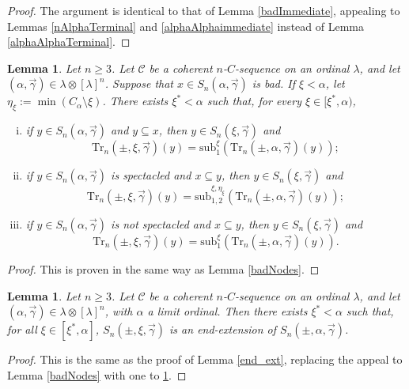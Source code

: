 \documentclass{amsart}
\numberwithin{theorem}{section}
\newtheorem{lemma}[theorem]{Lemma}
\theoremstyle{definition}
\renewcommand{\subset}{\subseteq}
\newcommand{\sub}{\mathrm{sub}}
\newcommand{\C}{\mathcal{C}}
\newcommand{\Tr}{\mathrm{Tr}}
\begin{document}
\begin{proof}
The argument is identical to that of Lemma \ref{badImmediate}, appealing to Lemmas \ref{nAlphaTerminal} and \ref{alphaAlphaimmediate} instead of Lemma \ref{alphaAlphaTerminal}.
\end{proof}

\begin{lemma}\label{nbadNodes}
Let $n\ge 3$. Let $\C$ be a coherent $n$-$C$-sequence on an ordinal $\lambda$, and let
$(\alpha,\vec{\gamma}) \in \lambda \otimes [\lambda]^n$. Suppose that $x\in S_n(\alpha,\vec\gamma)$ is bad. If $\xi<\alpha$, let $\eta_\xi:=\min(C_\alpha\setminus\xi)$. There exists $\xi^*<\alpha$ such that, for every $\xi\in [\xi^*,\alpha)$,
\begin{enumerate}[(i)]
\item if $y\in S_n(\alpha,\vec\gamma)$ and $y\subset x$, then $y\in S_n(\xi,\vec\gamma)$ and
\[
\Tr_n(\pm,\xi,\vec\gamma)(y)=\sub_1^\xi(\Tr_n(\pm,\alpha,\vec\gamma)(y));
\]
\item if $y\in S_n(\alpha,\vec\gamma)$ is spectacled and $x\subset y$, then $y\in S_n(\xi,\vec\gamma)$ and
\[
\Tr_n(\pm,\xi,\vec\gamma)(y)=\sub_{1,2}^{\xi,\eta_\xi}(\Tr_n(\pm,\alpha,\vec\gamma)(y));
\]
\item if $y\in S_n(\alpha,\vec\gamma)$ is not spectacled and $x\subset y$, then $y\in S_n(\xi,\vec\gamma)$ and
\[
\Tr_n(\pm,\xi,\vec\gamma)(y)=\sub_1^\xi(\Tr_n(\pm,\alpha,\vec\gamma)(y)).
\]
\end{enumerate}
\end{lemma}

\begin{proof}
This is proven in the same way as Lemma \ref{badNodes}.
\end{proof}

\begin{lemma}\label{end_ext_n}
Let $n\ge 3$. Let $\C$ be a coherent $n$-$C$-sequence on an ordinal $\lambda$, and let 
$(\alpha,\vec{\gamma}) \in \lambda \otimes [\lambda]^n$, with $\alpha$ a limit ordinal.
Then there exists $\xi^*<\alpha$ such that, for all $\xi\in [\xi^*,\alpha]$, $S_n(\pm,\xi,\vec\gamma)$ is an end-extension of $S_n(\pm,\alpha,\vec\gamma)$.
\end{lemma}

\begin{proof}
This is the same as the proof of Lemma \ref{end_ext}, replacing the appeal to Lemma \ref{badNodes} with one to \ref{nbadNodes}.
\end{proof}
\end{document}
